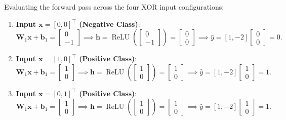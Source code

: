 Evaluating the forward pass across the four XOR input configurations:
\begin{enumerate}
  \item \textbf{Input $\mathbf{x} = [0, 0]^\top$ (Negative Class)}:
    \begin{equation}
    \mathbf{W}_1 \mathbf{x} + \mathbf{b}_1 = \begin{bmatrix} 0 \\ -1 \end{bmatrix} \implies \mathbf{h} = \operatorname{ReLU}\left(\begin{bmatrix} 0 \\ -1 \end{bmatrix}\right) = \begin{bmatrix} 0 \\ 0 \end{bmatrix} \implies \hat{y} = [1, -2] \begin{bmatrix} 0 \\ 0 \end{bmatrix} = 0.
    \end{equation}
  \item \textbf{Input $\mathbf{x} = [1, 0]^\top$ (Positive Class)}:
    \begin{equation}
    \mathbf{W}_1 \mathbf{x} + \mathbf{b}_1 = \begin{bmatrix} 1 \\ 0 \end{bmatrix} \implies \mathbf{h} = \operatorname{ReLU}\left(\begin{bmatrix} 1 \\ 0 \end{bmatrix}\right) = \begin{bmatrix} 1 \\ 0 \end{bmatrix} \implies \hat{y} = [1, -2] \begin{bmatrix} 1 \\ 0 \end{bmatrix} = 1.
    \end{equation}
  \item \textbf{Input $\mathbf{x} = [0, 1]^\top$ (Positive Class)}:
    \begin{equation}
    \mathbf{W}_1 \mathbf{x} + \mathbf{b}_1 = \begin{bmatrix} 1 \\ 0 \end{bmatrix} \implies \mathbf{h} = \operatorname{ReLU}\left(\begin{bmatrix} 1 \\ 0 \end{bmatrix}\right) = \begin{bmatrix} 1 \\ 0 \end{bmatrix} \implies \hat{y} = [1, -2] \begin{bmatrix} 1 \\ 0 \end{bmatrix} = 1.

\end{equation}
\end{enumerate}
